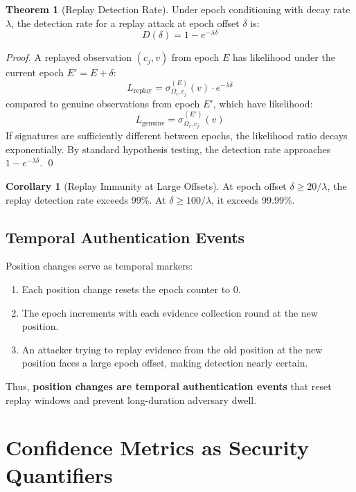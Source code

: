 \documentclass[11pt,a4paper]{article}
\theoremstyle{definition}
\newtheorem{theorem}[definition]{Theorem}
\newtheorem{corollary}[definition]{Corollary}
\begin{document}
\begin{theorem}[Replay Detection Rate]
Under epoch conditioning with decay rate $\lambda$, the detection rate for a replay attack at epoch offset $\delta$ is:
\[
D(\delta) = 1 - e^{-\lambda \delta}
\]
\end{theorem}

\begin{proof}
A replayed observation $(c_j, v)$ from epoch $E$ has likelihood under the current epoch $E' = E + \delta$:
\[
L_{\text{replay}} = \sigma_{\Omega_i, c_j}^{(E)}(v) \cdot e^{-\lambda \delta}
\]
compared to genuine observations from epoch $E'$, which have likelihood:
\[
L_{\text{genuine}} = \sigma_{\Omega_i, c_j}^{(E')}(v)
\]
If signatures are sufficiently different between epochs, the likelihood ratio decays exponentially. By standard hypothesis testing, the detection rate approaches $1 - e^{-\lambda \delta}$. \qed
\end{proof}

\begin{corollary}[Replay Immunity at Large Offsets]
At epoch offset $\delta \geq 20/\lambda$, the replay detection rate exceeds 99\%. At $\delta \geq 100/\lambda$, it exceeds 99.99\%.
\end{corollary}

\subsection{Temporal Authentication Events}

Position changes serve as temporal markers:
\begin{enumerate}
\item Each position change resets the epoch counter to 0.
\item The epoch increments with each evidence collection round at the new position.
\item An attacker trying to replay evidence from the old position at the new position faces a large epoch offset, making detection nearly certain.
\end{enumerate}

Thus, \textbf{position changes are temporal authentication events} that reset replay windows and prevent long-duration adversary dwell.

\section{Confidence Metrics as Security Quantifiers}
\label{sec:metrics}
\end{document}
